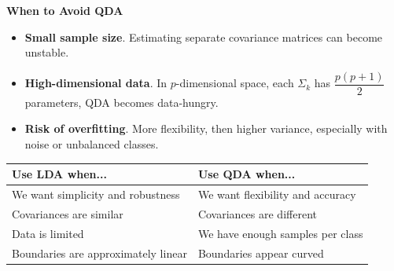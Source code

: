\highspace
\begin{flushleft}
    \textcolor{Red2}{ \textbf{When to Avoid QDA}}
\end{flushleft}
\begin{itemize}[label=\textcolor{Red2}{}]
    \item \textcolor{Red2}{\textbf{Small sample size}}. Estimating separate covariance matrices can become unstable.
    \item \textcolor{Red2}{\textbf{High-dimensional data}}. In $p$-dimensional space, each $\Sigma_{k}$ has $\dfrac{p\left(p+1\right)}{2}$ parameters, QDA becomes data-hungry.
    \item \textcolor{Red2}{\textbf{Risk of overfitting}}. More flexibility, then higher variance, especially with noise or unbalanced classes.
\end{itemize}

\begin{table}[!htp]
    \centering
    \begin{tabular}{@{} l | l @{}}
        \toprule
        Use \textbf{LDA} when... & Use \textbf{QDA} when... \\
        \midrule
        We want simplicity and robustness   & We want flexibility and accuracy \\ [.3em]
        Covariances are similar             & Covariances are different \\ [.3em]
        Data is limited                     & We have enough samples per class \\ [.3em]
        Boundaries are approximately linear & Boundaries appear curved \\
        \bottomrule
    \end{tabular}
\end{table}

\newpage

